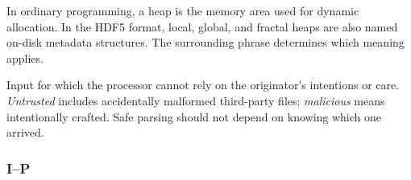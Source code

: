 \documentclass[../main.tex]{subfiles}
\begin{document}
\begin{description}[leftmargin=1.5em,style=nextline]
\item[Heap.]
In ordinary programming, a heap is the memory area used for dynamic
allocation. In the HDF5 format, local, global, and fractal heaps are also named
on-disk metadata structures. The surrounding phrase determines which meaning
applies.

\item[Hostile / malicious / untrusted input.]
Input for which the processor cannot rely on the originator's intentions or
care. \emph{Untrusted} includes accidentally malformed third-party files;
\emph{malicious} means intentionally crafted. Safe parsing should not depend
on knowing which one arrived.

\end{description}

\subsubsection{I--P}
\label{glossary:ip}
\end{document}
